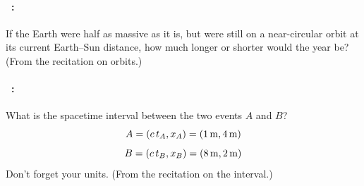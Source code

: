 \documentclass[12pt]{article} 
\begin{document}
\vfill

\paragraph{\problemname~\theproblem:}%
If the Earth were half as massive as it is, but were still
on a near-circular orbit at its current Earth--Sun distance, how much
longer or shorter would the year be? (From the recitation on orbits.)

\vfill

\paragraph{\problemname~\theproblem:}%
What is the spacetime interval between the two events $A$ and $B$?
$$A = (c\,t_A, x_A) = (1\,\mathrm{m}, 4\,\mathrm{m}) $$
$$B = (c\,t_B, x_B) = (8\,\mathrm{m}, 2\,\mathrm{m}) $$
Don't forget your units. (From the recitation on the interval.)

\vfill
~
\end{document}
